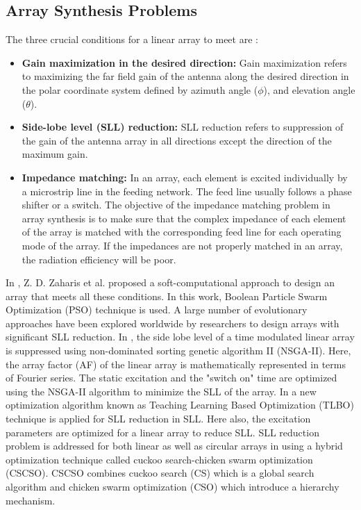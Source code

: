 \subsection{Array Synthesis Problems}
The three crucial conditions for a linear array to meet are \cite{arraySynth1}:
\begin{itemize}
\item \textbf{Gain maximization in the desired direction:} Gain maximization refers to maximizing the far field gain of the antenna along the desired direction in the polar coordinate system defined by azimuth angle ($\phi$), and elevation angle ($\theta$).
\item \textbf{Side-lobe level (SLL) reduction:} SLL reduction refers to suppression of the gain of the antenna array in all directions except the direction of the maximum gain.
\item \textbf{Impedance matching:} In an array, each element is excited individually by a microstrip line in the feeding network. The feed line usually follows a phase shifter or a switch. The objective of the impedance matching problem in array synthesis is to make sure that the complex impedance of each element of the array is matched with the corresponding feed line for each operating mode of the array. If the impedances are not properly matched in an array, the radiation efficiency will be poor.
\end{itemize}

In \cite{arraySynth1}, Z. D. Zaharis et al. proposed a soft-computational approach to design an array that meets all these conditions. In this work, Boolean Particle Swarm Optimization (PSO) technique is used. A large number of evolutionary approaches have been explored worldwide by researchers to design arrays with significant SLL reduction. In \cite{arraySynth2}, the side lobe level of a time modulated linear array is suppressed using non-dominated sorting genetic algorithm II (NSGA-II). Here, the array factor (AF) of the linear array is mathematically represented in terms of Fourier series. The static excitation and the "switch on" time are optimized using the NSGA-II algorithm to minimize the SLL of the array. In \cite{arraySynth3} a new optimization algorithm known as Teaching Learning Based Optimization (TLBO) technique is applied for SLL reduction in SLL. Here also, the excitation parameters are optimized for a linear array to reduce SLL. SLL reduction problem is addressed for both linear as well as circular arrays in \cite{arraySynth4} using a hybrid optimization technique called cuckoo search-chicken swarm optimization (CSCSO). CSCSO combines cuckoo search (CS) which is a global search algorithm and chicken swarm optimization (CSO) which introduce a hierarchy mechanism.

